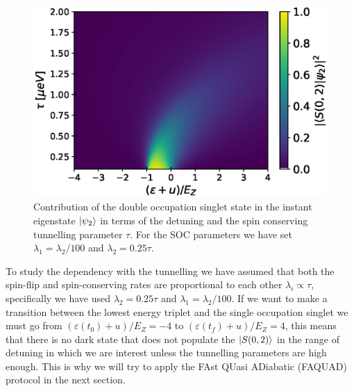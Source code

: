 \documentclass[a4paper,11pt]{article}
\begin{document}
\begin{figure}[!htbp]
	\centering
	\includegraphics[width=0.6\linewidth]{occupation_middle_state.eps}
	\caption{Contribution of the double occupation singlet state in the instant eigenstate $\ket{\psi_2}$ in terms of the detuning and the spin conserving tunnelling parameter $\tau$. For the SOC parameters we have set $\lambda_1=\lambda_2/100$ and $\lambda_2=0.25\tau$.}
	\label{fig:occupation_middle_state}
\end{figure}

To study the dependency with the tunnelling we have assumed that both the spin-flip and spin-conserving rates are proportional to each other $\lambda_i\propto \tau$, specifically we have used $\lambda_2=0.25\tau$ and $\lambda_1=\lambda_2/100$. If we want to make a transition between the lowest energy triplet and the single occupation singlet we must go from $(\varepsilon(t_0)+u)/E_Z=-4$ to $(\varepsilon(t_f)+u)/E_Z=4$, this means that there is no dark state that does not populate the $\ket{S(0,2)}$ in the range of detuning in which we are interest unless the tunnelling parameters are high enough. This is why we will try to apply the FAst QUasi ADiabatic (FAQUAD) protocol in the next section.
\end{document}
